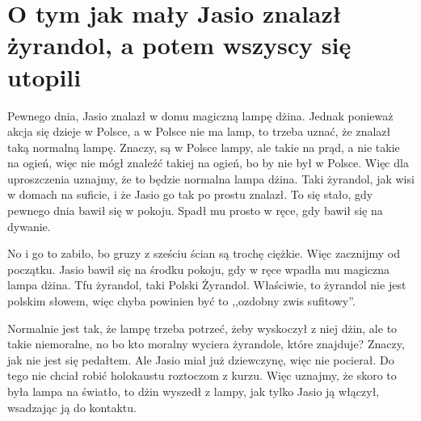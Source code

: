 \chapter{O tym jak mały Jasio znalazł żyrandol, a potem wszyscy się utopili}


Pewnego dnia, Jasio znalazł w domu magiczną lampę dżina.
Jednak ponieważ akcja się dzieje w Polsce, a w Polsce nie ma lamp, to trzeba uznać, że znalazł taką normalną lampę.
Znaczy, są w Polsce lampy, ale takie na prąd, a nie takie na ogień, więc nie mógł znaleźć takiej na ogień, bo by nie był w Polsce.
Więc dla uproszczenia uznajmy, że to będzie normalna lampa dżina. Taki żyrandol, jak wisi w domach na suficie, i że Jasio go tak po prostu znalazł. 
To się stało, gdy pewnego dnia bawił się w pokoju.
Spadł mu prosto w ręce, gdy bawił się na dywanie.

No i go to zabiło, bo gruzy z sześciu ścian są trochę ciężkie. Więc zacznijmy od początku.
Jasio bawił się na środku pokoju, gdy w ręce wpadła mu magiczna lampa dżina. Tfu żyrandol, taki Polski Żyrandol.
Właściwie, to żyrandol nie jest polskim słowem, więc chyba powinien być to ,,ozdobny zwis sufitowy''.

Normalnie jest tak, że lampę trzeba potrzeć, żeby wyskoczył z niej dżin, ale to takie niemoralne, no bo kto moralny wyciera żyrandole, które znajduje?
Znaczy, jak nie jest się pedałtem. Ale Jasio miał już dziewczynę, więc nie pocierał.
Do tego nie chciał robić holokaustu roztoczom z kurzu.
Więc uznajmy, że skoro to była lampa na światło, to dżin wyszedł z lampy, jak tylko Jasio ją włączył, wsadzając ją do kontaktu.

